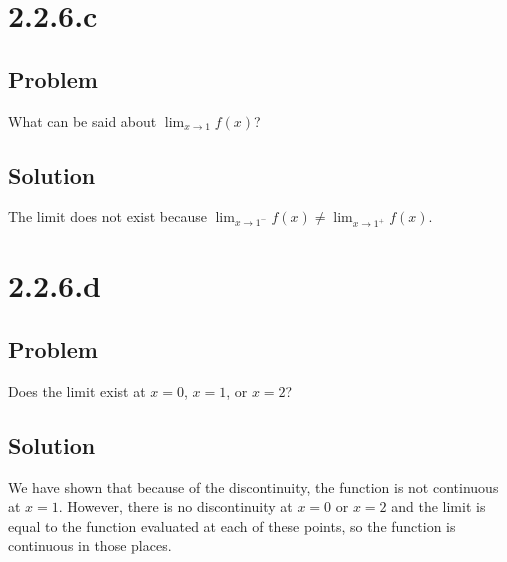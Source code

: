 \documentclass[12pt]{article}
\begin{document}
\section*{2.2.6.c}

\subsection*{Problem}
What can be said about $\lim_{x \to 1} f(x)$?

\subsection*{Solution}
The limit does not exist because $\lim_{x \to 1^-} f(x) \neq \lim_{x \to 1^+} f(x)$.



\section{2.2.6.d}

\subsection*{Problem}
Does the limit exist at $x = 0$, $x = 1$, or $x = 2$?

\subsection*{Solution}
We have shown that because of the discontinuity, the function is not continuous at $x = 1$. However, there is no discontinuity at $x = 0$ or $x = 2$ and the limit is equal to the function evaluated at each of these points, so the function is continuous in those places.
\end{document}
